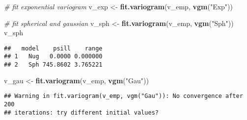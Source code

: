 \documentclass[]{book}
\newenvironment{Shaded}{\begin{snugshade}}{\end{snugshade}}
\newcommand{\CommentTok}[1]{\textcolor[rgb]{0.56,0.35,0.01}{\textit{#1}}}
\newcommand{\KeywordTok}[1]{\textcolor[rgb]{0.13,0.29,0.53}{\textbf{#1}}}
\newcommand{\NormalTok}[1]{#1}
\newcommand{\StringTok}[1]{\textcolor[rgb]{0.31,0.60,0.02}{#1}}
\begin{document}
\begin{Shaded}
\begin{Highlighting}[]
\CommentTok{# fit exponential variogram}
\NormalTok{v_exp <-}\StringTok{ }\KeywordTok{fit.variogram}\NormalTok{(v_emp, }\KeywordTok{vgm}\NormalTok{(}\StringTok{"Exp"}\NormalTok{))}

\CommentTok{# fit spherical and gaussian}
\NormalTok{v_sph <-}\StringTok{ }\KeywordTok{fit.variogram}\NormalTok{(v_emp, }\KeywordTok{vgm}\NormalTok{(}\StringTok{"Sph"}\NormalTok{))}
\NormalTok{v_sph}
\end{Highlighting}
\end{Shaded}

\begin{verbatim}
##   model    psill    range
## 1   Nug   0.0000 0.000000
## 2   Sph 745.8602 3.765221
\end{verbatim}

\begin{Shaded}
\begin{Highlighting}[]
\NormalTok{v_gau <-}\StringTok{ }\KeywordTok{fit.variogram}\NormalTok{(v_emp, }\KeywordTok{vgm}\NormalTok{(}\StringTok{"Gau"}\NormalTok{))}
\end{Highlighting}
\end{Shaded}

\begin{verbatim}
## Warning in fit.variogram(v_emp, vgm("Gau")): No convergence after 200
## iterations: try different initial values?
\end{verbatim}
\end{document}
